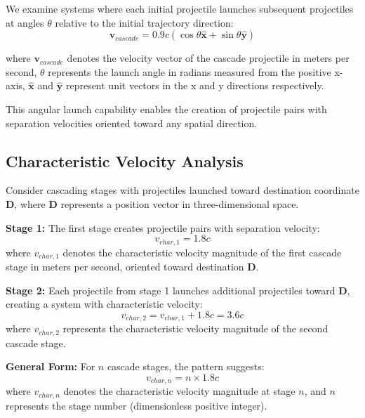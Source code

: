 \documentclass[12pt,a4paper]{article}
\begin{document}
We examine systems where each initial projectile launches subsequent projectiles at angles $\theta$ relative to the initial trajectory direction:
\begin{equation}
\mathbf{v}_{cascade} = 0.9c(\cos\theta\hat{\mathbf{x}} + \sin\theta\hat{\mathbf{y}})
\end{equation}

where $\mathbf{v}_{cascade}$ denotes the velocity vector of the cascade projectile in meters per second, $\theta$ represents the launch angle in radians measured from the positive x-axis, $\hat{\mathbf{x}}$ and $\hat{\mathbf{y}}$ represent unit vectors in the x and y directions respectively.

This angular launch capability enables the creation of projectile pairs with separation velocities oriented toward any spatial direction.

\subsection{Characteristic Velocity Analysis}

Consider cascading stages with projectiles launched toward destination coordinate $\mathbf{D}$, where $\mathbf{D}$ represents a position vector in three-dimensional space.

\textbf{Stage 1:}
The first stage creates projectile pairs with separation velocity:
\begin{equation}
v_{char,1} = 1.8c
\end{equation}
where $v_{char,1}$ denotes the characteristic velocity magnitude of the first cascade stage in meters per second, oriented toward destination $\mathbf{D}$.

\textbf{Stage 2:}
Each projectile from stage 1 launches additional projectiles toward $\mathbf{D}$, creating a system with characteristic velocity:
\begin{equation}
v_{char,2} = v_{char,1} + 1.8c = 3.6c
\end{equation}
where $v_{char,2}$ represents the characteristic velocity magnitude of the second cascade stage.

\textbf{General Form:}
For $n$ cascade stages, the pattern suggests:
\begin{equation}
v_{char,n} = n \times 1.8c
\end{equation}
where $v_{char,n}$ denotes the characteristic velocity magnitude at stage $n$, and $n$ represents the stage number (dimensionless positive integer).
\end{document}
